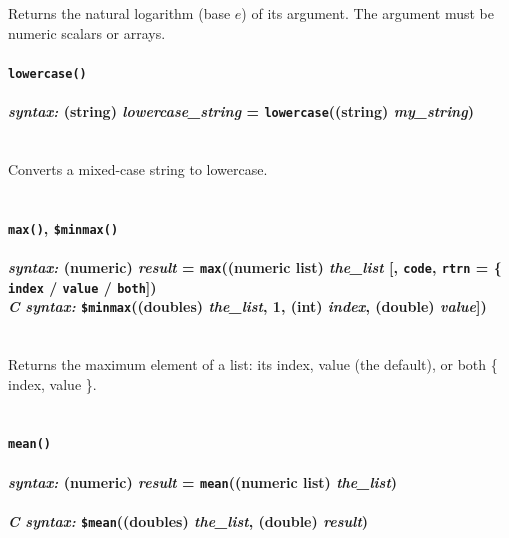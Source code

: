 \documentclass{article}
\begin{document}
Returns the natural logarithm (base $e$) of its argument.  The argument must be numeric scalars or arrays.\\






\paragraph{\texttt{lowercase()}\\\\
\normalfont \emph{syntax: } (string) \emph{lowercase\_string} = \texttt{lowercase}((string) \emph{my\_string})\\\\}

Converts a mixed-case string to lowercase.\\\\




\paragraph{\texttt{max()}, \texttt{\$minmax()}\\\\
\normalfont \emph{syntax: } (numeric) \emph{result} = \texttt{max}((numeric list) \emph{the\_list} [, \texttt{code}, \texttt{rtrn} = \{ \texttt{index} / \texttt{value} / \texttt{both}])\\
\normalfont \emph{C syntax: } \texttt{\$minmax}((doubles) \emph{the\_list}, 1, (int) \emph{index}, (double) \emph{value}])\\\\}

Returns the maximum element of a list:  its index, value (the default), or both \{ index, value \}.\\\\




\paragraph{\texttt{mean()}\\\\
\normalfont \emph{syntax: } (numeric) \emph{result} = \texttt{mean}((numeric list) \emph{the\_list})\\\\
\normalfont \emph{C syntax: } \texttt{\$mean}((doubles) \emph{the\_list}, (double) \emph{result})\\\\}
\end{document}
